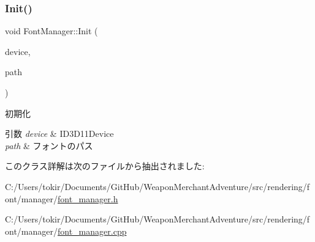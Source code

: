 \subsubsection{\texorpdfstring{Init()}{Init()}}
{\footnotesize\ttfamily void Font\+Manager\+::\+Init (\begin{DoxyParamCaption}\item[{I\+D3\+D11\+Device $\ast$}]{device,  }\item[{W\+C\+H\+AR $\ast$}]{path }\end{DoxyParamCaption})}



初期化 


\begin{DoxyParams}{引数}
{\em device} & I\+D3\+D11\+Device \\
\hline
{\em path} & フォントのパス \\
\hline
\end{DoxyParams}


このクラス詳解は次のファイルから抽出されました\+:\begin{DoxyCompactItemize}
\item 
C\+:/\+Users/tokir/\+Documents/\+Git\+Hub/\+Weapon\+Merchant\+Adventure/src/rendering/font/manager/\mbox{\hyperlink{font__manager_8h}{font\+\_\+manager.\+h}}\item 
C\+:/\+Users/tokir/\+Documents/\+Git\+Hub/\+Weapon\+Merchant\+Adventure/src/rendering/font/manager/\mbox{\hyperlink{font__manager_8cpp}{font\+\_\+manager.\+cpp}}\end{DoxyCompactItemize}
